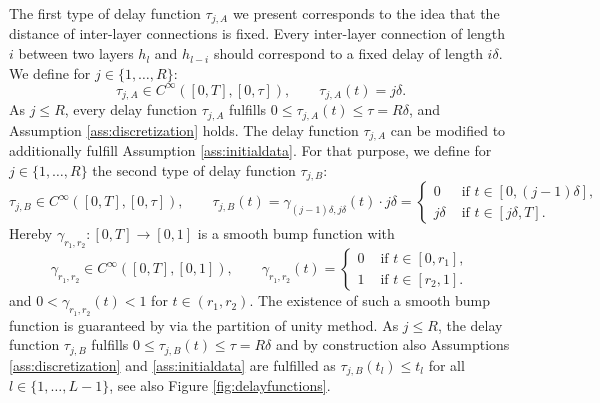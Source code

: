 \documentclass[10pt]{article}
\numberwithin{equation}{section}
\begin{document}
	The first type of delay function $\tau_{j,A}$ we present corresponds to the idea that the distance of inter-layer connections is fixed. Every inter-layer connection of length $i$ between two layers $h_l$ and $h_{l-i}$ should correspond to a fixed delay of length $i\delta$. We define for $j \in \{1,\ldots,R\}$:
	\begin{equation*}
		\tau_{j,A}\in C^\infty([0,T],[0,\tau]), \qquad \tau_{j,A}(t) = j \delta.
	\end{equation*}
	As $j \leq R$, every delay function $\tau_{j,A}$ fulfills $0\leq \tau_{j,A}(t) \leq \tau = R\delta$, and Assumption \ref{ass:discretization} holds. The delay function $\tau_{j,A}$ can be modified to additionally fulfill Assumption \ref{ass:initialdata}. For that purpose, we define for $j \in \{1,\ldots,R\}$ the second type of delay function $\tau_{j,B}$:
	\begin{equation*}
		\tau_{j,B} \in C^\infty([0,T],[0,\tau]), \qquad \tau_{j,B}(t) = \gamma_{(j-1)\delta,j\delta}(t) \cdot j \delta =\begin{cases}
			0  &\text{ if } t \in [0,(j-1)\delta], \\
			j\delta  &\text{ if } t \in [j\delta,T].
		\end{cases}
	\end{equation*}
	Hereby $\gamma_{r_1,r_2}:[0,T]\rightarrow [0,1]$ is a smooth bump function with
	\begin{equation*}
		\gamma_{r_1,r_2} \in C^\infty([0,T],[0,1]), \qquad \gamma_{r_1,r_2}(t)  =\begin{cases}
			0  &\text{ if } t \in [0,r_1], \\
			1  &\text{ if } t \in [r_2,1].
		\end{cases}
	\end{equation*}
	and $0<\gamma_{r_1,r_2}(t)<1$ for $t\in(r_1,r_2)$. The existence of such a smooth bump function is guaranteed by \cite[Lemma 2.21]{Lee2013} via the partition of unity method. 	As $j \leq R$, the delay function $\tau_{j,B}$ fulfills $0\leq \tau_{j,B}(t) \leq \tau = R\delta$ and by construction also Assumptions \ref{ass:discretization} and \ref{ass:initialdata} are fulfilled as $\tau_{j,B}(t_l)\leq t_l$ for all $l \in \{1,\ldots,L-1\}$, see also Figure \ref{fig:delayfunctions}.
	
\end{document}
